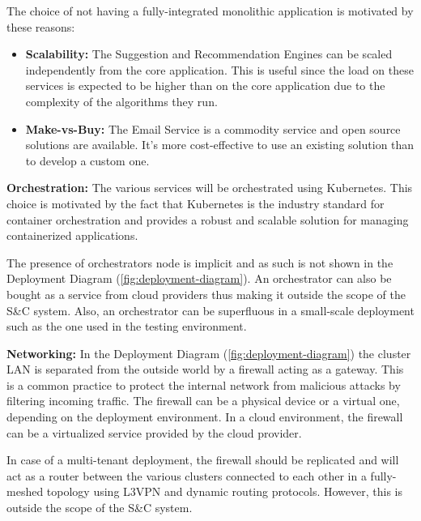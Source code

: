 The choice of not having a fully-integrated monolithic application is motivated by these reasons:

\begin{itemize}
      \item \textbf{Scalability:} The Suggestion and Recommendation Engines can be scaled independently from the core
            application. This is useful since the load on these services is expected to be higher than on the core
            application due to the complexity of the algorithms they run.
      \item \textbf{Make-vs-Buy:} The Email Service is a commodity service and open source solutions are available.
            It's more cost-effective to use an existing solution than to develop a custom one.
\end{itemize}

\par{\textbf{Orchestration:}} The various services will be orchestrated using Kubernetes. This choice is motivated by
the fact that Kubernetes is the industry standard for container orchestration and provides a robust and scalable
solution for managing containerized applications.

The presence of orchestrators node is implicit and as such is not shown in the Deployment Diagram
(\ref{fig:deployment-diagram}). An orchestrator can also be bought as a service from cloud providers thus making it
outside the scope of the S\&C system.  Also, an orchestrator can be superfluous in a small-scale deployment
such as the one used in the testing environment.

\par{\textbf{Networking:}} In the Deployment Diagram (\ref{fig:deployment-diagram}) the cluster LAN is separated from
the outside world by a firewall acting as a gateway. This is a common practice to protect the internal network from
malicious attacks by filtering incoming traffic. The firewall can be a physical device or a virtual one, depending on
the deployment environment. In a cloud environment, the firewall can be a virtualized service provided by the cloud
provider.

In case of a multi-tenant deployment, the firewall should be replicated and will act as a router between the various
clusters connected to each other in a fully-meshed topology using L3VPN and dynamic routing protocols. However, this
is outside the scope of the S\&C system.
